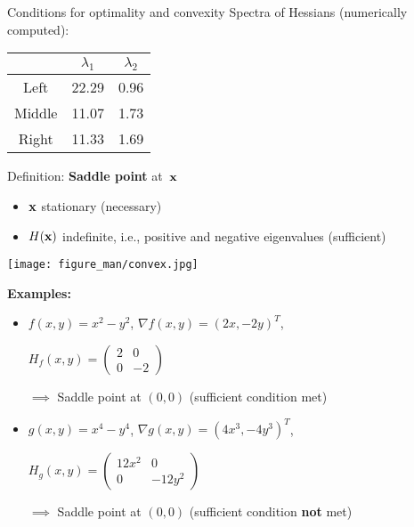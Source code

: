 \documentclass[11pt,compress,t,notes=noshow, xcolor=table]{beamer}
\begin{document}
\begin{vbframe}{Conditions for optimality and convexity}
Spectra of Hessians (numerically computed):

\begin{table}
    \centering
    \begin{tabular}{c|c|c}
               & $\lambda_1$ & $\lambda_2$ \\ \hline\hline
        Left   & 22.29       & 0.96        \\ \hline
        Middle & 11.07       & 1.73        \\ \hline
        Right  & 11.33       & 1.69
    \end{tabular}
\end{table}


\framebreak

Definition: \textbf{Saddle point} at~$\mathbf{x}$
\begin{itemize}
    \item $\mathbf{x}$ stationary (necessary)
    \item $H(\mathbf{x})$ indefinite, i.e., positive and negative eigenvalues (sufficient)
\end{itemize}

\lz

\begin{center}
    \texttt{[image: figure\_man/convex.jpg]}
\end{center}

\framebreak

\textbf{Examples:}

\lz

\begin{itemize}
    \item $f(x,y) = x^2 - y^2$, $\nabla f(x,y) = (2x,-2y)^T$,

        $H_f(x,y) = \begin{pmatrix}2 & 0 \\ 0 & -2\end{pmatrix}$

        $\implies$ Saddle point at $(0,0)$ (sufficient condition met)

    \vspace{\baselineskip}

    \item $g(x,y) = x^4 - y^4$, $\nabla g(x,y) = (4x^3,-4y^3)^T$,

        $H_g(x,y) = \begin{pmatrix}12x^2 & 0 \\ 0 & -12y^2\end{pmatrix}$

        $\implies$ Saddle point at $(0,0)$ (sufficient condition \textbf{not} met)
\end{itemize}

\end{vbframe}

\endlecture
\end{document}
